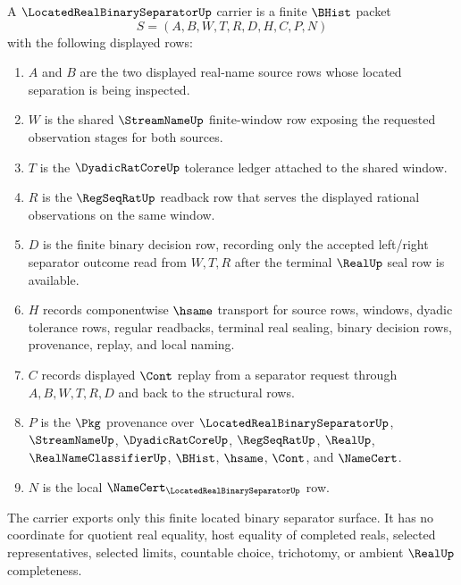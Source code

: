 \begin{definition}
\label{def:located-real-separator-carrier}
A $\LocatedRealBinarySeparatorUp$ carrier is a finite $\BHist$ packet
$$
S=(A,B,W,T,R,D,H,C,P,N)
$$
with the following displayed rows:
\begin{enumerate}
\item $A$ and $B$ are the two displayed real-name source rows whose located separation is being inspected.
\item $W$ is the shared $\StreamNameUp$ finite-window row exposing the requested observation stages for both sources.
\item $T$ is the $\DyadicRatCoreUp$ tolerance ledger attached to the shared window.
\item $R$ is the $\RegSeqRatUp$ readback row that serves the displayed rational observations on the same window.
\item $D$ is the finite binary decision row, recording only the accepted left/right separator outcome read from $W,T,R$ after the terminal $\RealUp$ seal row is available.
\item $H$ records componentwise $\hsame$ transport for source rows, windows, dyadic tolerance rows, regular readbacks, terminal real sealing, binary decision rows, provenance, replay, and local naming.
\item $C$ records displayed $\Cont$ replay from a separator request through $A,B,W,T,R,D$ and back to the structural rows.
\item $P$ is the $\Pkg$ provenance over $\LocatedRealBinarySeparatorUp$, $\StreamNameUp$, $\DyadicRatCoreUp$, $\RegSeqRatUp$, $\RealUp$, $\RealNameClassifierUp$, $\BHist$, $\hsame$, $\Cont$, and $\NameCert$.
\item $N$ is the local $\NameCert_{\LocatedRealBinarySeparatorUp}$ row.
\end{enumerate}
The carrier exports only this finite located binary separator surface. It has no coordinate for quotient real equality, host equality of completed reals, selected representatives, selected limits, countable choice, trichotomy, or ambient $\RealUp$ completeness.
\end{definition}

